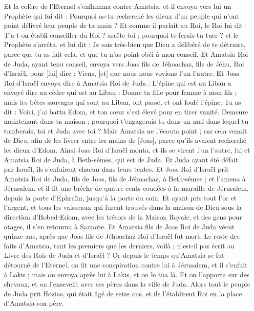 \begin{multicols}{2}
Et la colère de l'Eternel s'enflamma contre Amatsia, et il envoya vers lui un Prophète qui lui dit : Pourquoi as-tu recherché les dieux d'un peuple qui n'ont point délivré leur peuple de ta main ?
Et comme il parlait au Roi, le Roi lui dit : T'a-t-on établi conseiller du Roi ? arrête-toi ; pourquoi te ferais-tu tuer ? et le Prophète s'arrêta, et lui dit : Je sais très-bien que Dieu a délibéré de te détruire, parce que tu as fait cela, et que tu n'as point obéi à mon conseil.
Et Amatsia Roi de Juda, ayant tenu conseil, envoya vers Joas fils de Jéhoachaz, fils de Jéhu, Roi d'Israël, pour [lui] dire : Viens, [et] que nous nous voyions l'un l'autre.
Et Joas Roi d'Israël envoya dire à Amatsia Roi de Juda : L'épine qui est au Liban a envoyé dire au cèdre qui est au Liban : Donne ta fille pour femme à mon fils ; mais les bêtes sauvages qui sont au Liban, ont passé, et ont foulé l'épine.
Tu as dit : Voici, j'ai battu Edom, et ton cœur s'est élevé pour en tirer vanité. Demeure maintenant dans ta maison ; pourquoi t'engagerais-tu dans un mal dans lequel tu tomberais, toi et Juda avec toi ?
Mais Amatsia ne l'écouta point ; car cela venait de Dieu, afin de les livrer entre les mains de [Joas], parce qu'ils avaient recherché les dieux d'Edom.
Ainsi Joas Roi d'Israël monta, et ils se virent l'un l'autre, lui et Amatsia Roi de Juda, à Beth-sémes, qui est de Juda.
Et Juda ayant été défait par Israël, ils s'enfuirent chacun dans leurs tentes.
Et Joas Roi d'Israël prit Amatsia Roi de Juda, fils de Joas, fils de Jéhoachaz, à Beth-sémes ; et l'amena à Jérusalem, et il fit une brèche de quatre cents coudées à la muraille de Jérusalem, depuis la porte d'Ephraïm, jusqu'à la porte du coin.
Et ayant pris tout l'or et l'argent, et tous les vaisseaux qui furent trouvés dans la maison de Dieu sous la direction d'Hobed-Edom, avec les trésors de la Maison Royale, et des gens pour otages, il s'en retourna à Samarie.
Et Amatsia fils de Joas Roi de Juda vécut quinze ans, après que Joas fils de Jéhoachaz Roi d'Israël fut mort.
Le reste des faits d'Amatsia, tant les premiers que les derniers, voilà ; n'est-il pas écrit au Livre des Rois de Juda et d'Israël ?
Or depuis le temps qu'Amatsia se fut détourné de l'Eternel, on fit une conspiration contre lui à Jérusalem, et il s'enfuit à Lakis ; mais on envoya après lui à Lakis, et on le tua là.
Et on l'apporta sur des chevaux, et on l'ensevelit avec ses pères dans la ville de Juda.
\VerseOne{}Alors tout le peuple de Juda prit Hozias, qui était âgé de seize ans, et ils l'établirent Roi en la place d'Amatsia son père.

\end{multicols}
